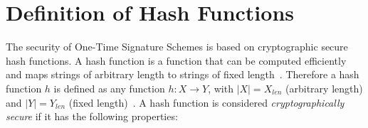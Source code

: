 

\section{Definition of Hash Functions}
The security of One-Time Signature Schemes is based on cryptographic secure hash functions. A hash function is a function that can be computed efficiently and maps strings of arbitrary length to strings of fixed length~\cite{cha:bg_hashfunctions_thesis_matusiewicz2007}. Therefore a hash function $h$ is defined as any function $h: X \rightarrow Y$, with $|X| = X_{len}$ (arbitrary length) and $|Y| = Y_{len}$ (fixed length)~\cite{cha:bg_hashfunctoins_Stinson2006}. A hash function is considered \textit{cryptographically secure} if it has the following  properties:~\cite{cha:bg_hashfunctions_BASIC_DEFINITIONS_Springer2004} 

